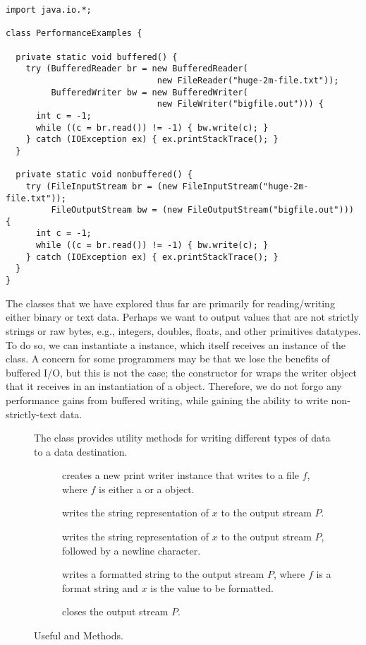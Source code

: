 \begin{lstlisting}[language=MyJava]
import java.io.*;

class PerformanceExamples {
  
  private static void buffered() {
    try (BufferedReader br = new BufferedReader(
                              new FileReader("huge-2m-file.txt"));
         BufferedWriter bw = new BufferedWriter(
                              new FileWriter("bigfile.out"))) {
      int c = -1;
      while ((c = br.read()) != -1) { bw.write(c); }
    } catch (IOException ex) { ex.printStackTrace(); }
  }
  
  private static void nonbuffered() {
    try (FileInputStream br = (new FileInputStream("huge-2m-file.txt"));
         FileOutputStream bw = (new FileOutputStream("bigfile.out"))) {
      int c = -1;
      while ((c = br.read()) != -1) { bw.write(c); }
    } catch (IOException ex) { ex.printStackTrace(); }
  }
}
\end{lstlisting}  

The classes that we have explored thus far are primarily for reading/writing either binary or text data. Perhaps we want to output values that are not strictly strings or raw bytes, e.g., integers, doubles, floats, and other primitives datatypes. To do so, we can instantiate a  instance, which itself receives an instance of the  class. A concern for some programmers may be that we lose the benefits of buffered I/O, but this is not the case; the constructor for  wraps the writer object that it receives in an instantiation of a  object. Therefore, we do not forgo any performance gains from buffered writing, while gaining the ability to write non-strictly-text data.

\begin{figure}[tp]
  \small
  \begin{tcolorbox}[title=PrintWriter Methods]
    The  class provides utility methods for writing different types of data to a data destination.
    \vspace{2ex}
  \begin{description}
    \item [] creates a new print writer instance that writes to a file $f$, where $f$ is either a  or a  object.
    \item [] writes the string representation of $x$ to the output stream $P$.
    \item [] writes the string representation of $x$ to the output stream $P$, followed by a newline character.
    \item [] writes a formatted string to the output stream $P$, where $f$ is a format string and $x$ is the value to be formatted.
    \item [] closes the output stream $P$.
  \end{description}
\end{tcolorbox}
  \caption{Useful  and  Methods.}
  \label{fig:bwbr}
\end{figure}

